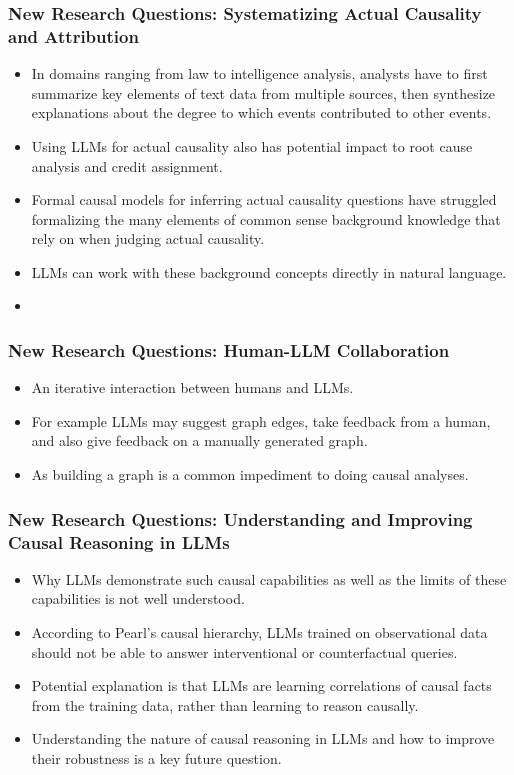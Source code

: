 \documentclass{beamer}
\begin{document}
\begin{frame}
	\frametitle{New Research Questions: Systematizing Actual Causality and Attribution}
	\begin{itemize}
		\item In domains ranging from law to intelligence analysis, analysts 
			have to first summarize key elements of text data from 
			multiple sources, then synthesize explanations about the 
			degree to which events contributed to other events.
		\item Using LLMs for actual causality also has potential impact
			to root cause analysis and credit assignment.
		\item Formal causal models for inferring actual causality questions have
			struggled formalizing the many elements of common sense 
			background knowledge that rely on when judging actual causality.
		\item LLMs can work with these background concepts directly in natural
			language.
		\item {}
	\end{itemize}
\end{frame}

\begin{frame}
	\frametitle{New Research Questions: Human-LLM Collaboration}
	\begin{itemize}
		\item An iterative interaction between humans and LLMs.
		\item For example LLMs may suggest graph edges, take feedback from
			a human, and also give feedback on a manually generated
			graph.
		\item As building a graph is a common impediment to
			doing causal analyses.
	\end{itemize}
\end{frame}

\begin{frame}
	\frametitle{New Research Questions: Understanding and Improving Causal Reasoning in LLMs}
	\begin{itemize}
		\item Why LLMs demonstrate such causal capabilities as well as
			the limits of these capabilities is not well
			understood.
		\item According to Pearl's causal hierarchy, LLMs trained on
			observational data should not be able to answer
			interventional or counterfactual queries.
		\item Potential explanation is that LLMs are learning correlations
			of causal facts from the training data, rather than learning
			to reason causally.
		\item Understanding the nature of causal reasoning in LLMs and how to
			improve their robustness is a key future question.
	\end{itemize}
\end{frame}
\end{document}
